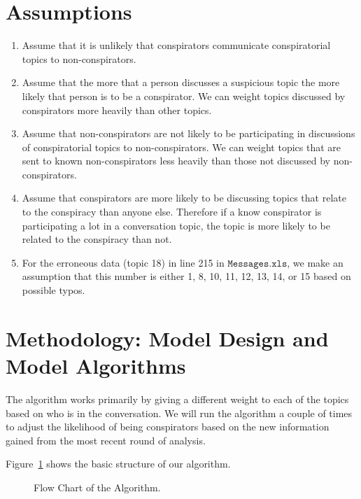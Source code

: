 \documentclass{icmmcm}
\begin{document}
\section{Assumptions}
\begin{enumerate}

\item Assume that it is unlikely that conspirators communicate
conspiratorial topics to non-conspirators.\label{cons_inside}

\item Assume that the more that a person discusses a suspicious topic the more likely that person is to be a conspirator.
 We can weight topics discussed by conspirators more heavily than other topics. 
\label{cons_involve}

\item 
Assume that non-conspirators are not likely to be participating in discussions of
conspiratorial topics to non-conspirators. 
 We can weight topics that are sent to known non-conspirators less heavily than
 those not discussed by non-conspirators.
\label{cons_not_involve}


\item Assume that conspirators are more likely to be discussing topics that relate to the conspiracy than anyone else.
Therefore if a know conspirator is participating a lot in a conversation topic,
the topic is more likely to be related to the conspiracy than not. \label{cons_topic}

\item For the erroneous data (topic 18) in line 215 in $\mathtt{Messages.xls}$, 
we make an assumption that this number is either 1, 8, 10, 11, 12, 13, 14, or 15
based on possible typos.
\end{enumerate}
\section{Methodology: Model Design and Model Algorithms}
The algorithm works primarily by giving a different weight to each of the 
topics based on who is in the conversation. We will run the algorithm
a couple of times to adjust the likelihood of being conspirators
based on the new information gained from the most 
recent round of analysis. 

Figure~\ref{fig:flow_chart} shows the basic 
structure of our algorithm.
\begin{figure}[ht]
\begin{center}
\end{center}
\caption[Algorithm Flow Chart]
{Flow Chart of the Algorithm.\label{flow_chart}}%
\label{fig:flow_chart}
\end{figure}
\end{document}
